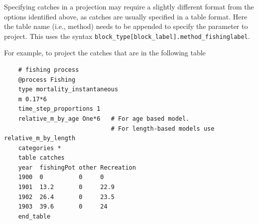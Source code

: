 


\subsubsection{}
\label{sec:Project-Catch}

Specifying catches in a projection may require a slightly different format from the options identified above, as catches are usually specified in a table format. Here the table name (i.e., method) needs to be appended to specify the parameter to project. This uses the syntax \texttt{block\_type[block\_label].method\_fishinglabel}. 

For example, to project the  catches that are in the following table

{\small{\begin{verbatim}
	# fishing process
	@process Fishing
	type mortality_instantaneous
	m 0.17*6
	time_step_proportions 1
	relative_m_by_age One*6   # For age based model. 
	                          # For length-based models use relative_m_by_length
	categories *
	table catches
	year  fishingPot other Recreation
	1900  0          0     0
	1901  13.2       0     22.9
	1902  26.4       0     23.5
	1903  39.6       0     24
	end_table
\end{verbatim}}}

